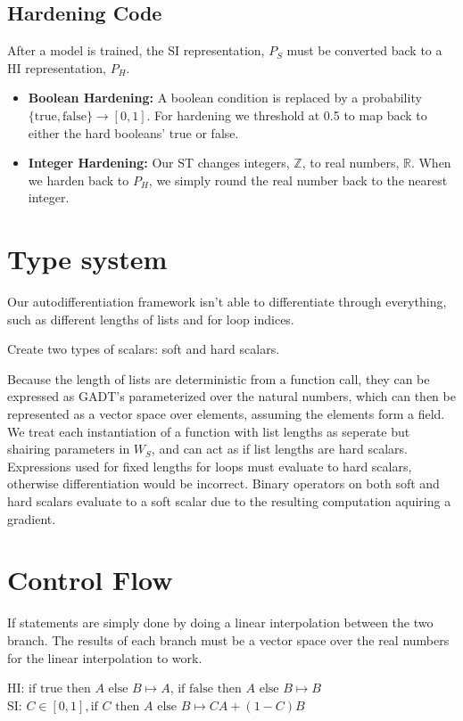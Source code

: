 \documentclass{article}
\begin{document}
\subsection{Hardening Code}
After a model is trained, the SI representation, $P_S$ must be converted back to a HI representation, $P_H$.
\begin{itemize}
    \item \textbf{Boolean Hardening:} A boolean condition is replaced by a probability $\{\text{true}, \text{false} \} \longrightarrow [0, 1]$. For hardening we threshold at 0.5 to map back to either the hard booleans' true or false.
    \item \textbf{Integer Hardening:} Our ST changes integers, $\mathbb{Z}$, to real numbers, $\mathbb{R}$. When we harden back to $P_H$, we simply round the real number back to the nearest integer.
\end{itemize}

\section{Type system}
Our autodifferentiation framework isn't able to differentiate through everything, such as different lengths of lists and for loop indices.

Create two types of scalars: soft and hard scalars.

Because the length of lists are deterministic from a function call, they can be expressed as GADT's parameterized over the natural numbers, which can then be represented as a vector space over elements, assuming the elements form a field. We treat each instantiation of a function with list lengths as seperate but shairing parameters in $W_S$, and can act as if list lengths are hard scalars. Expressions used for fixed lengths for loops must evaluate to hard scalars, otherwise differentiation would be incorrect. Binary operators on both soft and hard scalars evaluate to a soft scalar due to the resulting computation aquiring a gradient.
\section{Control Flow}
If statements are simply done by doing a linear interpolation between the two branch. The results of each branch must be a vector space over the real numbers for the linear interpolation to work.

\begin{center}
  HI: $\text{if } \text{true} \text{ then } A \text{ else } B \mapsto A$, $\text{if } \text{false} \text{ then } A \text{ else } B \mapsto B$\\
  SI: $C \in [0, 1], \text{if } C \text{ then } A \text{ else } B \mapsto CA + (1-C)B$
\end{center}
\end{document}

